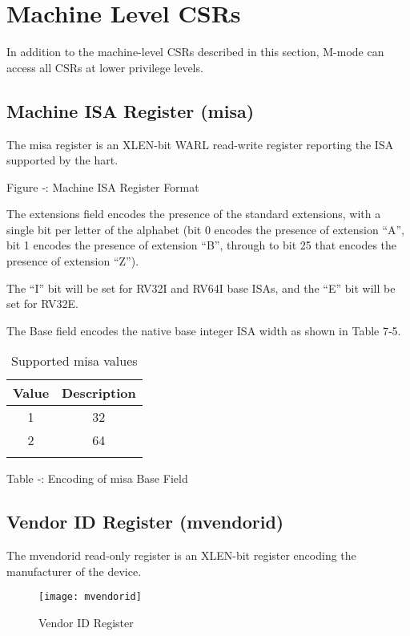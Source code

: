 \protect\hypertarget{_Toc326677757}{}{\protect\hypertarget{_Toc327108346}{}{}}

\section{Machine Level CSRs}\label{machine-level-csrs}

In addition to the machine-level CSRs described in this section, M-mode
can access all CSRs at lower privilege levels.

\subsection{Machine ISA Register
(misa)}\label{machine-isa-register-misa}

The misa register is an XLEN-bit WARL read-write register reporting the
ISA supported by the hart.

\missingfigure{}


Figure ‑: Machine ISA Register Format

The extensions field encodes the presence of the standard extensions,
with a single bit per letter of the alphabet (bit 0 encodes the presence
of extension ``A'', bit 1 encodes the presence of extension ``B'',
through to bit 25 that encodes the presence of extension ``Z'').

The ``I'' bit will be set for RV32I and RV64I base ISAs, and the ``E''
bit will be set for RV32E.

The Base field encodes the native base integer ISA width as shown in
Table 7‑5.

\begin{longtable}[]{@{}cc@{}}
\toprule
Value & Description\tabularnewline
\midrule
\endhead
1 & 32\tabularnewline
2 & 64\tabularnewline
\bottomrule
\caption{Supported misa values}
\label{tab:misa-values}
\end{longtable}

\protect\hypertarget{_Ref367027661}{}{}Table ‑: Encoding of misa Base
Field

\subsection{Vendor ID Register
(mvendorid)}\label{vendor-id-register-mvendorid}

The mvendorid read-only register is an XLEN-bit register encoding the
manufacturer of the device.

\begin{figure}[hbt]
  \texttt{[image: mvendorid]}
  \caption{Vendor ID Register}
\end{figure}


